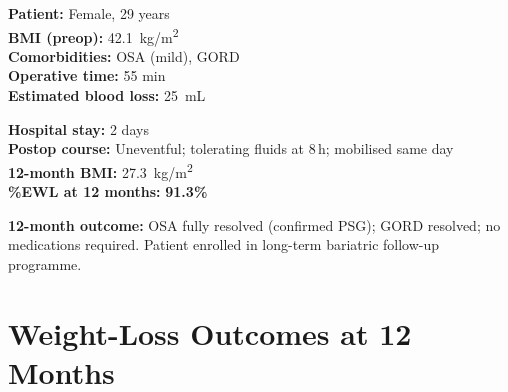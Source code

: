 \documentclass[11pt,a4paper]{article}
\begin{document}
\begin{tcolorbox}[casebox, title={\faUser\enspace Case 3\enspace\textendash\enspace
  Excellent Outcome: Highest \%EWL in Series}]
\small
\begin{minipage}[t]{0.48\linewidth}
  \textbf{\color{SurgBlue}Patient:} Female, 29 years\\
  \textbf{\color{SurgBlue}BMI (preop):} 42.1~kg/m\textsuperscript{2}\\
  \textbf{\color{SurgBlue}Comorbidities:} OSA (mild), GORD\\
  \textbf{\color{SurgBlue}Operative time:} 55 min\\
  \textbf{\color{SurgBlue}Estimated blood loss:} 25~mL
\end{minipage}%
\hfill%
\begin{minipage}[t]{0.48\linewidth}
  \textbf{\color{SurgBlue}Hospital stay:} 2 days\\
  \textbf{\color{SurgBlue}Postop course:} Uneventful; tolerating
    fluids at 8\,h; mobilised same day\\
  \textbf{\color{SurgBlue}12-month BMI:} 27.3~kg/m\textsuperscript{2}\\
  \textbf{\color{SurgBlue}\%EWL at 12 months:} \textbf{91.3\%}
\end{minipage}

\vspace{6pt}
\textbf{\color{SurgTeal}12-month outcome:} OSA fully resolved (confirmed PSG);
GORD resolved; no medications required. Patient enrolled in long-term
bariatric follow-up programme.
\end{tcolorbox}

\vspace{8pt}

\section{Weight-Loss Outcomes at 12 Months}
\end{document}
